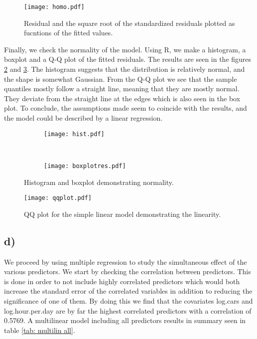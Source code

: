 \documentclass[a4paper, 10pt, reqno]{amsart}
\begin{document}
\begin{figure}
    \centering
    \texttt{[image: homo.pdf]}
    \caption{Residual and the square root of the standardized residuals plotted as fucntions of the fitted values.}
    \label{fig: homo}
\end{figure}

Finally, we check the normality of the model. Using R, we make a histogram, a boxplot and a Q-Q plot of the fitted residuals. The results are seen in the figures \ref{fig: histbox} and \ref{fig: qq}. The histogram suggests that the distribution is relatively normal, and the shape is somewhat Gaussian. From the Q-Q plot we see that the sample quantiles mostly follow a straight line, meaning that they are mostly normal. They deviate from the straight line at the edges which is also seen in the box plot. To conclude, the assumptions made seem to coincide with the results, and the model could be described by a linear regression.

\begin{figure}
    \centering
    \begin{subfigure}{0.48\textwidth}
        \texttt{[image: hist.pdf]}
    \end{subfigure}
    ~
    \begin{subfigure}{0.48\textwidth}
        \texttt{[image: boxplotres.pdf]}
    \end{subfigure}
    \caption{Histogram and boxplot demonstrating normality.}
    \label{fig: histbox}
\end{figure}

\begin{figure}
    \centering
    \texttt{[image: qqplot.pdf]}
    \caption{QQ plot for the simple linear model demonstrating the linearity.}
    \label{fig: qq}
\end{figure}

\subsection{d)}
We proceed by using multiple regression to study the simultaneous effect of the various predictors. We start by checking the correlation between predictors. This is done in order to not include highly correlated predictors which would both increase the standard error of the correlated variables in addition to reducing the significance of one of them. By doing this we find that the covariates log.cars and log.hour.per.day are by far the highest correlated predictors with a correlation of 0.5769. A multilinear model including all predictors results in summary seen in table \ref{tab: multilin all}.
\end{document}
